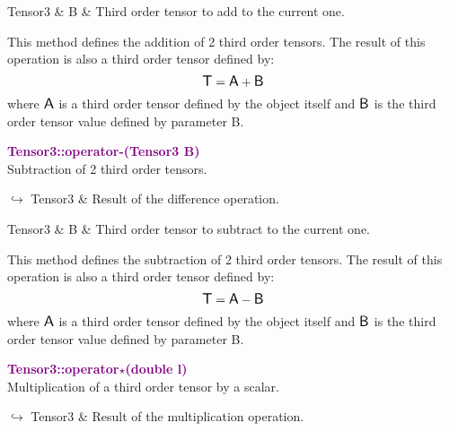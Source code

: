 \begin{tcolorbox}[width=\textwidth,myArgs,tabularx={ll|R}]
Tensor3 & B & Third order tensor to add to the current one.
\end{tcolorbox}

This method defines the addition of 2 third order tensors.
The result of this operation is also a third order tensor defined by:
\begin{equation*}
\mbox{\large\ensuremath{\mathsf{T}}} = \mbox{\large\ensuremath{\mathsf{A}}} + \mbox{\large\ensuremath{\mathsf{B}}}
\end{equation*}
where $\mbox{\large\ensuremath{\mathsf{A}}}$ is a third order tensor defined by the object itself and $\mbox{\large\ensuremath{\mathsf{B}}}$ is the third order tensor value defined by parameter B.

\textcolor{purple}{\textbf{Tensor3::operator-(Tensor3 B)}}\label{Tensor3::operator-(Tensor3 B)}\\
Subtraction of 2 third order tensors.\vspace*{-0.5em}
\begin{tcolorbox}[grow to left by=-1cm, width=\textwidth-1cm,myArgs,tabularx={l|R}]
$\hookrightarrow$ Tensor3 & Result of the difference operation.
\end{tcolorbox}

\begin{tcolorbox}[width=\textwidth,myArgs,tabularx={ll|R}]
Tensor3 & B & Third order tensor to subtract to the current one.
\end{tcolorbox}

This method defines the subtraction of 2 third order tensors.
The result of this operation is also a third order tensor defined by:
\begin{equation*}
\mbox{\large\ensuremath{\mathsf{T}}} = \mbox{\large\ensuremath{\mathsf{A}}} - \mbox{\large\ensuremath{\mathsf{B}}}
\end{equation*}
where $\mbox{\large\ensuremath{\mathsf{A}}}$ is a third order tensor defined by the object itself and $\mbox{\large\ensuremath{\mathsf{B}}}$ is the third order tensor value defined by parameter B.

\textcolor{purple}{\textbf{Tensor3::operator$\star$(double l)}}\label{Tensor3::operator*(double l)}\\
Multiplication of a third order tensor by a scalar.\vspace*{-0.5em}
\begin{tcolorbox}[grow to left by=-1cm, width=\textwidth-1cm,myArgs,tabularx={l|R}]
$\hookrightarrow$ Tensor3 & Result of the multiplication operation.
\end{tcolorbox}

